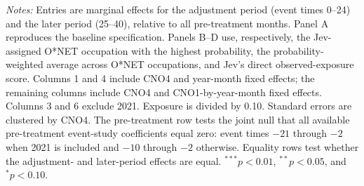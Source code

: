 \begin{table}[H]
\begin{threeparttable}
\begin{minipage}{0.92\textwidth}
\emph{Notes:} Entries are marginal effects for the adjustment period (event times 0--24) and the later period (25--40), relative to all pre-treatment months. Panel A reproduces the baseline specification. Panels B--D use, respectively, the Jev-assigned O*NET occupation with the highest probability, the probability-weighted average across O*NET occupations, and Jev's direct observed-exposure score. Columns 1 and 4 include CNO4 and year-month fixed effects; the remaining columns include CNO4 and CNO1-by-year-month fixed effects. Columns 3 and 6 exclude 2021. Exposure is divided by 0.10. Standard errors are clustered by CNO4. The pre-treatment row tests the joint null that all available pre-treatment event-study coefficients equal zero: event times $-21$ through $-2$ when 2021 is included and $-10$ through $-2$ otherwise. Equality rows test whether the adjustment- and later-period effects are equal. $^{***}p<0.01$, $^{**}p<0.05$, and $^{*}p<0.10$.
\end{minipage}
\end{threeparttable}
\end{table}
